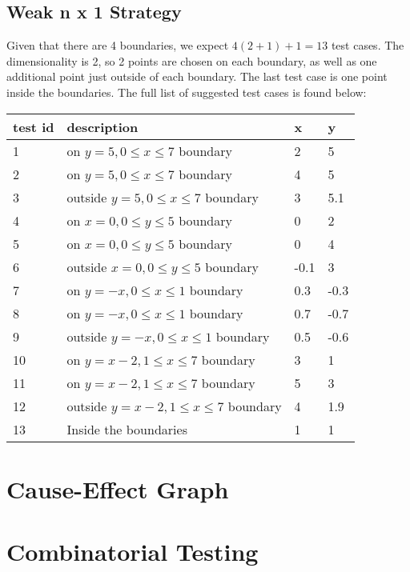 \documentclass[letterpaper]{article}
\begin{document}
\subsection{Weak n x 1 Strategy}
Given that there are 4 boundaries, we expect $4(2+1) +1 = 13$ test cases. 
The dimensionality is 2, so 2 points are chosen on each boundary, as well
as one additional point just outside of each boundary. The last test case
is one point inside the boundaries. The full list of suggested test cases
is found below: 
\begin{adjustbox}{center}
	\begin{tabular}{llll}
		test id & description 			        & x & y    \\ \hline
		1       & on $y=5, 0\leq x\leq 7$ boundary      & 2 & 5    \\
		2       & on $y=5, 0\leq x\leq 7$ boundary      & 4 & 5    \\
		3       & outside $y=5, 0\leq x\leq 7$ boundary & 3 & 5.1 \\
		4 & on $x=0, 0\leq y \leq 5$ boundary           & 0 & 2 \\
		5 & on $x=0, 0\leq y \leq 5$ boundary           & 0 & 4 \\
		6 & outside $x=0, 0\leq y \leq 5$ boundary      & -0.1 & 3 \\
		7 & on $y=-x, 0\leq x\leq 1$ boundary           & 0.3 & -0.3 \\
		8 & on $y=-x, 0\leq x\leq 1$ boundary           & 0.7 & -0.7 \\
		9 & outside  $y=-x, 0\leq x\leq 1$ boundary      & 0.5 & -0.6 \\
		10 & on $y=x-2, 1\leq x \leq 7$ boundary        & 3 & 1 \\
		11 & on $y=x-2, 1\leq x \leq 7$ boundary        & 5 & 3 \\
		12 & outside $y=x-2, 1\leq x \leq 7$ boundary   & 4 & 1.9 \\
		13 & Inside the boundaries                      & 1 & 1 \\


                                                      
                                                      
                                                    
\end{tabular}
\end{adjustbox}
\section{Cause-Effect Graph}

\section{Combinatorial Testing}
\end{document}
